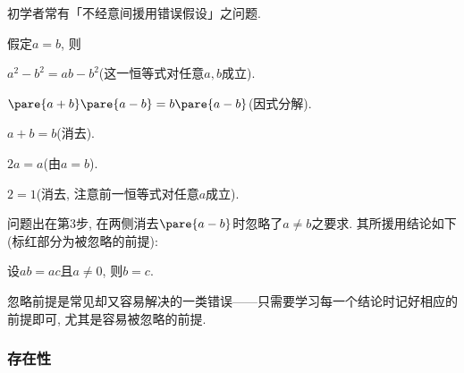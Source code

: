 \documentclass[hidelinks]{ctexart}
\begin{document}
初学者常有「不经意间援用错误假设」之问题.
\begin{sample}
    \begin{ex}[证明$1=2$]
        假定$a=b$, 则
        \begin{cenum}
            \item $a^2- b^2 = ab - b^2$(这一恒等式对任意$a,b$成立).
            \item $\pare{a+b}\pare{a-b} = b\pare{a-b}$(因式分解).
            \item $a+b = b$(消去).
            \item $2a = a$(由$a=b$).
            \item $2 = 1$(消去, 注意前一恒等式对任意$a$成立).
        \end{cenum}
    \end{ex}
    问题出在第$3$步, 在两侧消去$\pare{a-b}$时忽略了$a\neq b$之要求. 其所援用结论如下(标红部分为被忽略的前提):
    \begin{lemma}[消去律]
        设$ab=ac$且{\color{red}$a\neq 0$}, 则$b=c$.
    \end{lemma}
\end{sample}
忽略前提是常见却又容易解决的一类错误——只需要学习每一个结论时记好相应的前提即可, 尤其是容易被忽略的前提.


\subsubsection{存在性} %
\label{ssub:存在性}
\end{document}
